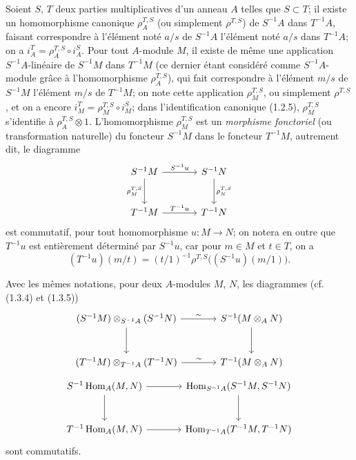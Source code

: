 \begin{env}[1.4.1]
\label{0.1.4.1-fr}
Soient $S$, $T$ deux parties multiplicatives d'un anneau $A$ telles que $S\subset T$; il existe un homomorphisme canonique $\rho_A^{T,S}$ (ou simplement $\rho^{T,S}$) de $S^{-1}A$ dans $T^{-1}A$, faisant correspondre à l'élément noté $a/s$ de $S^{-1}A$ l'élément noté $a/s$ dans $T^{-1}A$; on a $i_A^T=\rho_A^{T,S}\circ i_A^S$.
Pour tout $A$-module $M$, il existe de même une application $S^{-1}A$-linéaire de $S^{-1}M$ dans $T^{-1}M$ (ce dernier étant considéré comme $S^{-1}A$-module grâce à l'homomorphisme $\rho_A^{T,S}$), qui fait correspondre à l'élément $m/s$ de $S^{-1}M$ l'élément $m/s$ de $T^{-1}M$; on note cette application $\rho_M^{T,S}$, ou simplement $\rho^{T,S}$, et on a encore $i_M^T=\rho_M^{T,S}\circ i_M^S$;
dans l'identification canonique (1.2.5), $\rho_M^{T,S}$ s'identifie à $\rho_A^{T,S}\otimes 1$.
L'homomorphisme $\rho_M^{T,S}$ est un \emph{morphisme fonctoriel} (ou transformation naturelle) du foncteur $S^{-1}M$ dans le foncteur $T^{-1}M$, autrement dit, le diagramme
\[
\begin{tikzcd}[column sep=large,row sep=large]
S^{-1}M \arrow[r,"S^{-1}u"] \arrow[d,"\rho_M^{T,S}"'] & S^{-1}N \arrow[d,"\rho_N^{T,S}"] \\
T^{-1}M \arrow[r,"T^{-1}u"] & T^{-1}N
\end{tikzcd}
\]
est commutatif, pour tout homomorphisme $u:M\to N$; on notera en outre que $T^{-1}u$ est entièrement déterminé par $S^{-1}u$, car pour $m\in M$ et $t\in T$, on a
\[
  (T^{-1}u)(m/t)=(t/1)^{-1}\rho^{T,S}\bigl((S^{-1}u)(m/1)\bigr).
\]
\end{env}

\begin{env}[1.4.2]
\label{0.1.4.2-fr}
Avec les mêmes notations, pour deux $A$-modules $M$, $N$, les diagrammes (cf. (1.3.4) et (1.3.5))
\[
\begin{tikzcd}[column sep=large,row sep=large]
(S^{-1}M)\otimes_{S^{-1}A}(S^{-1}N) \arrow[r,"\sim"] \arrow[d]
  & S^{-1}(M\otimes_A N) \arrow[d]
  \\
(T^{-1}M)\otimes_{T^{-1}A}(T^{-1}N) \arrow[r,"\sim"]
  & T^{-1}(M\otimes_A N)
\end{tikzcd}
\]
\[
\begin{tikzcd}[column sep=large,row sep=large]
S^{-1}\operatorname{Hom}_A(M,N) \arrow[r] \arrow[d]
  & \operatorname{Hom}_{S^{-1}A}(S^{-1}M,S^{-1}N) \arrow[d] \\
T^{-1}\operatorname{Hom}_A(M,N) \arrow[r]
  & \operatorname{Hom}_{T^{-1}A}(T^{-1}M,T^{-1}N)
\end{tikzcd}
\]
sont commutatifs.
\end{env}

